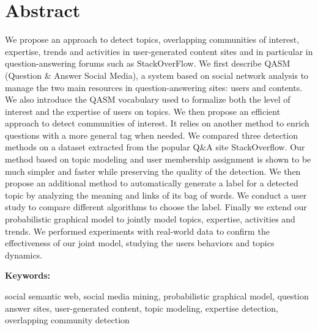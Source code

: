 \documentclass[a4paper,11pt,twoside]{ThesisStyle}
\begin{document}
\cleardoublepage
\section*{Abstract}
We propose an approach to detect topics, overlapping communities of interest, expertise, trends and activities in user-generated content sites and in particular in question-answering forums such as StackOverFlow. We first describe QASM (Question \& Answer Social Media), a system based on social network analysis to manage the two main resources in question-answering sites: users and contents. We also introduce the QASM vocabulary used to formalize both the level of interest and the expertise of users on topics. We then propose an efficient approach to detect communities of interest. It relies on another method to enrich questions with a more general tag when needed.  We compared three detection methods on a dataset extracted from the popular Q\&A site StackOverflow. Our method based on topic modeling and user membership assignment is shown to be much simpler and faster while preserving the quality of the detection. We then propose an additional method to automatically generate a label for a detected topic by analyzing the meaning and links of its bag of words. We conduct a user study to compare different algorithms to choose the label. Finally we extend our probabilistic graphical model to jointly model topics, expertise, activities and trends. We performed experiments with real-world data to confirm the effectiveness of our joint model, studying the users\’ behaviors and topics dynamics.

\textbf{Keywords:}

social semantic web, social media mining, probabilistic graphical model, question answer sites,  user-generated content, topic modeling, expertise detection, overlapping community detection

\cleardoublepage
\end{document}
